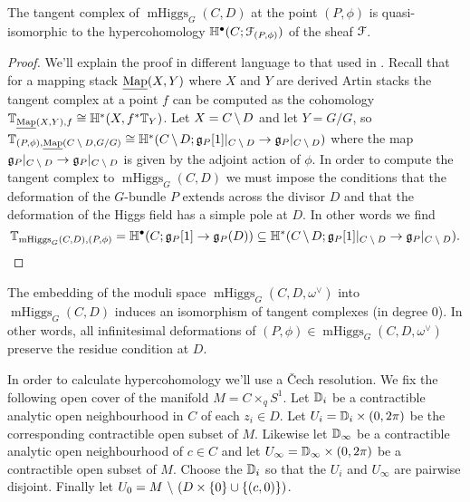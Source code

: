 \documentclass[10pt, oneside]{article}
\DeclareMathOperator{\mhiggs}{mHiggs}
\newcommand{\map}{\ul{\mr{Map}}}
\begin{document}
\begin{prop}
The tangent complex of $\mhiggs_G(C, D)$ at the point $(P,\phi)$ is quasi-isomorphic to the hypercohomology $\mathbb{H}^\bullet(C; \mathcal{F}_{(P,\phi)})$ of the sheaf $\mathcal{F}$.
\end{prop}

\begin{proof}
We'll explain the proof in different language to that used in \cite{Bottacin}.  Recall that for a mapping stack $\map(X,Y)$ where $X$ and $Y$ are derived Artin stacks the tangent complex at a point $f$ can be computed as the cohomology $\bb T_{\map(X,Y),f} \iso \bb H^*(X, f^*\bb T_Y)$.  Let $X = C \!\ \backslash \ \! D$ and let $Y = G/G$, so $\bb T_{(P,\phi), \map(C \!\bs\! D, G/G)} \iso \bb H^*(C \!\bs\! D; \gg_P[1]|_{C \!\bs\! D} \to \gg_P|_{C \!\bs\! D})$ where the map $\mathfrak{g}_P|_{C \!\ \backslash \ \! D} \to \mathfrak{g}_P|_{C \!\ \backslash \ \! D}$ is given by the adjoint action of $\phi$.  In order to compute the tangent complex to $\mhiggs_G(C,D)$ we must impose the conditions that the deformation of the $G$-bundle $P$ extends across the divisor $D$ and that the deformation of the Higgs field has a simple pole at $D$.  In other words we find
\[ \bb T_{\mhiggs_G(C,D), (P,\phi)} = \bb H^\bullet(C; \gg_P[1] \to \gg_P(D)) \sub \bb H^*(C \!\bs\! D; \gg_P[1]|_{C \!\bs\! D} \to \gg_P|_{C \!\bs\! D}).\]
\end{proof}

\begin{remark}
The embedding of the moduli space $\mhiggs_G(C, D,\omega^\vee)$ into $\mhiggs_G(C, D)$ induces an isomorphism of tangent complexes (in degree 0).  In other words, all infinitesimal deformations of $(P,\phi) \in \mhiggs_G(C, D,\omega^\vee)$ preserve the residue condition at $D$.
\end{remark}

In order to calculate hypercohomology we'll use a \v Cech resolution.  We fix the following open cover of the manifold $M = C \times_q S^1$.  Let $\mathbb{D}_i$ be a contractible analytic open neighbourhood in $C$ of each $z_i \in D$.  Let $U_i = \mathbb{D}_i \times (0,2\pi)$ be the corresponding contractible open subset of $M$.  Likewise let $\mathbb{D}_\infty$ be a contractible analytic open neighbourhood of $c \in C$ and let $U_\infty = \mathbb{D}_\infty \times (0,2\pi)$ be a contractible open subset of $M$.  Choose the $\mathbb{D}_i$ so that the $U_i$ and $U_\infty$ are pairwise disjoint.  Finally let $U_0 = M \ \backslash \  (D \times \{0\} \cup \{(c,0)\})$.
\end{document}
